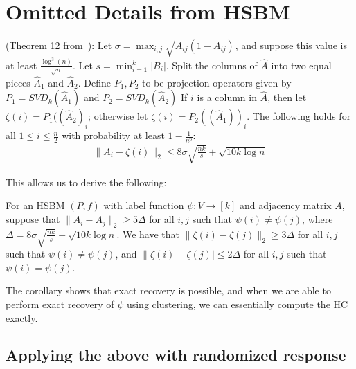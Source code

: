 \iffalse
\section{Omitted Details from HSBM}

\iffalse 
\begin{thm}\label{thm:SBM-recovery}
(Theorem 12 from~\cite{mcsherry2001spectral}): Let $\sigma = \max_{i,j} \sqrt{A_{ij}(1-A_{ij})}$, and suppose this value is at least $\frac{\log^3(n)}{\sqrt{n}}$. Let $s = \min_{i=1}^k |B_i|$. Split the columns of $\hat{A}$ into two equal pieces $\hat{A}_1$ and $\hat{A}_2$. Define $P_1, P_2$ to be projection operators given by $P_1 = SVD_k(\hat{A}_1)$ and $P_2 = SVD_k(\hat{A}_2)$ If $i$ is a column in $\hat{A}$, then let $\zeta(i) = P_1((\hat{A}_2)_i$; otherwise let $\zeta(i) = P_2((\hat{A}_1))_i$. The following holds for all $1 \leq i \leq \frac{n}{2}$ with probability at least $1-\frac{1}{n^6}$:
\begin{align*}
    \|A_i - \zeta(i)\|_2 \leq 8 \sigma \sqrt{\tfrac{nk}{s}} + \sqrt{10k \log n}
\end{align*}
\end{thm}


This allows us to derive the following:

\begin{coro}
    For an HSBM $(P,f)$ with label function $\psi : V \rightarrow [k]$ and adjacency matrix $A$, suppose that $\|A_i - A_j\|_2 \geq 5\Delta$ for all $i,j$ such that $\psi(i) \neq \psi(j)$, where $\Delta = 8 \sigma \sqrt{\tfrac{nk}{s}} + \sqrt{10k \log n}$. We have that $\|\zeta(i) - \zeta(j)\|_2 \geq 3\Delta$ for all $i,j$ such that $\psi(i) \neq \psi(j)$, and $\|\zeta(i) - \zeta(j)| \leq 2\Delta$ for all $i,j$ such that $\psi(i) = \psi(j)$.
\end{coro}

The corollary shows that exact recovery is possible, and when we are able to perform exact recovery of $\psi$ using clustering, we can essentially compute the HC exactly. 


\subsection{Applying the above with randomized response}

